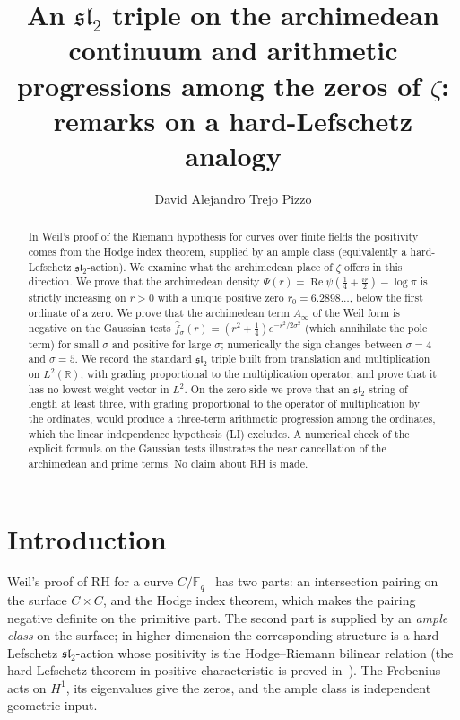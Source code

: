 \documentclass[11pt]{amsart}
\title[Lefschetz-type structures and the zeros of zeta]{An $\mathfrak{sl}_2$ triple on the archimedean
continuum and arithmetic progressions among the zeros of $\zeta$: remarks on a
hard-Lefschetz analogy}
\author{David Alejandro Trejo Pizzo}
\theoremstyle{definition}
\theoremstyle{remark}
\newcommand{\RH}{\mathrm{RH}}
\newcommand{\Ainf}{A_\infty}
\newcommand{\sltwo}{\mathfrak{sl}_2}
\DeclareMathOperator{\Real}{Re}
\begin{document}
\begin{abstract}
In Weil's proof of the Riemann hypothesis for curves over finite fields the
positivity comes from the Hodge index theorem, supplied by an ample class
(equivalently a hard-Lefschetz $\sltwo$-action). We examine what the archimedean
place of $\zeta$ offers in this direction. We prove that the archimedean density
$\Psi(r)=\Real\psi(\tfrac14+\tfrac{ir}{2})-\log\pi$ is strictly increasing on
$r>0$ with a unique positive zero $r_0=6.2898\ldots$, below the first ordinate of
a zero. We prove that the archimedean term $\Ainf$ of the Weil form is negative
on the Gaussian tests $\widehat f_\sigma(r)=(r^2+\frac14)e^{-r^2/2\sigma^2}$ (which
annihilate the pole term) for small $\sigma$ and positive for large $\sigma$;
numerically the sign changes between $\sigma=4$ and $\sigma=5$. We record the
standard $\sltwo$ triple built from translation and multiplication on
$L^2(\mathbb R)$, with grading proportional to the multiplication operator, and
prove that it has no lowest-weight vector in $L^2$. On the zero side we prove
that an $\sltwo$-string of length at least three, with grading proportional to
the operator of multiplication by the ordinates, would produce a three-term
arithmetic progression among the ordinates, which the linear independence
hypothesis (LI) excludes. A numerical check of the explicit formula on the
Gaussian tests illustrates the near cancellation of the archimedean and prime
terms. No claim about RH is made.
\end{abstract}
\maketitle

\tableofcontents
\newpage

\section{Introduction}
Weil's proof of $\RH$ for a curve $C/\mathbb F_q$~\cite{Weil48,bgWeil49} has two
parts: an intersection pairing on the surface $C\times C$, and the Hodge index
theorem, which makes the pairing negative definite on the primitive part. The
second part is supplied by an \emph{ample class} on the surface; in higher
dimension the corresponding structure is a hard-Lefschetz $\sltwo$-action whose
positivity is the Hodge--Riemann bilinear relation (the hard Lefschetz theorem
in positive characteristic is proved in~\cite{bgDeligne}). The Frobenius acts on $H^1$, its eigenvalues give the
zeros, and the ample class is independent geometric input.
\end{document}
